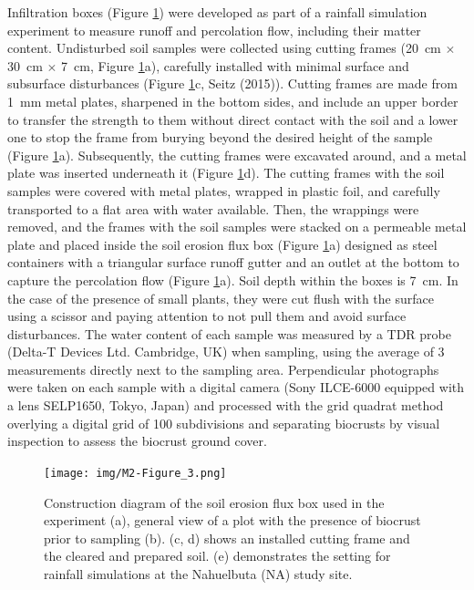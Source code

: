 Infiltration boxes (Figure \ref{fig:M2-F3}) were developed as part of a rainfall simulation experiment to measure runoff and percolation flow, including their matter content. Undisturbed soil samples were collected using cutting frames (\SI{20}{\centi\metre} $\times$ \SI{30}{\centi\metre} $\times$ \SI{7}{\centi\metre}, Figure \ref{fig:M2-F3}a), carefully installed with minimal surface and subsurface disturbances (Figure \ref{fig:M2-F3}c, Seitz (2015)). Cutting frames are made from \SI{1}{\milli\meter} metal plates, sharpened in the bottom sides, and include an upper border to transfer the strength to them without direct contact with the soil and a lower one to stop the frame from burying beyond the desired height of the sample (Figure \ref{fig:M2-F3}a). Subsequently, the cutting frames were excavated around, and a metal plate was inserted underneath it (Figure \ref{fig:M2-F3}d). The cutting frames with the soil samples were covered with metal plates, wrapped in plastic foil, and carefully transported to a flat area with water available. Then, the wrappings were removed, and the frames with the soil samples were stacked on a permeable metal plate and placed inside the soil erosion flux box (Figure \ref{fig:M2-F3}a) designed as steel containers with a triangular surface runoff gutter and an outlet at the bottom to capture the percolation flow (Figure \ref{fig:M2-F3}a). Soil depth within the boxes is \SI{7}{\centi\meter}. In the case of the presence of small plants, they were cut flush with the surface using a scissor and paying attention to not pull them and avoid surface disturbances. The water content of each sample was measured by a TDR probe (Delta-T Devices Ltd. Cambridge, UK) when sampling, using the average of 3 measurements directly next to the sampling area. Perpendicular photographs were taken on each sample with a digital camera (Sony ILCE-6000 equipped with a lens SELP1650, Tokyo, Japan) and processed with the grid quadrat method overlying a digital grid of 100 subdivisions and separating biocrusts by visual inspection \citep{Belnap2001} to assess the biocrust ground cover.

\begin{figure}[H]
	\centering
	\texttt{[image: img/M2-Figure\_3.png]}
	\caption{Construction diagram of the soil erosion flux box used in the experiment (a), general view of a plot with the presence of biocrust prior to sampling (b). (c, d) shows an installed cutting frame and the cleared and prepared soil. (e) demonstrates the setting for rainfall simulations at the Nahuelbuta (NA) study site.}
	\label{fig:M2-F3}
\end{figure}

